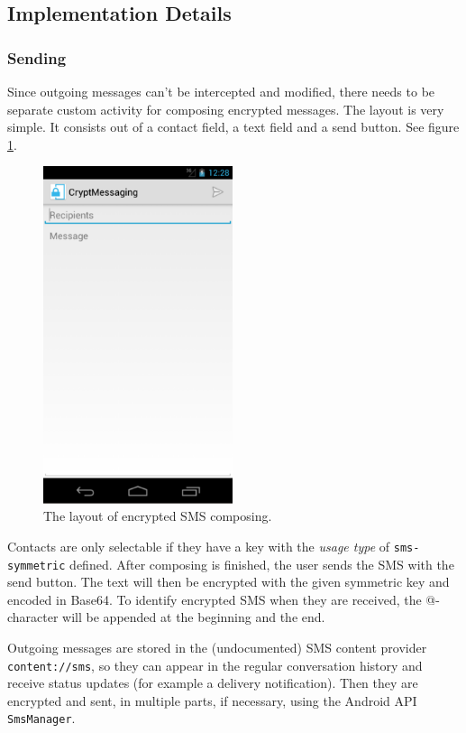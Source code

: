 \documentclass[a4paper,draft]{scrartcl}
\begin{document}
	\subsection{Implementation Details}
		\subsubsection{Sending}
			Since outgoing messages can't be intercepted and modified, there needs to be separate custom activity for composing encrypted messages.  The layout is very simple. It consists out of a contact field, a text field and a send button. See figure \ref{fig:compose}.
			\begin{figure}[h]
				\centering
					\includegraphics[width=15em]{crypt-compose}
				\caption{The layout of encrypted SMS composing.}
				\label{fig:compose}
			\end{figure}

			Contacts are only selectable if they have a key with the {\em usage type} of \texttt{sms-symmetric} defined. After composing is finished, the user sends the SMS with the send button. The text will then be encrypted with the given symmetric key and encoded in Base64. To identify encrypted SMS when they are received, the @-character will be appended at the beginning and the end.

			Outgoing messages are stored in the (undocumented) SMS content provider \linebreak %
			\texttt{content://sms}, so they can appear in the regular conversation history and receive status updates (for example a delivery notification). Then they are encrypted and sent, in multiple parts, if necessary, using the Android API \texttt{SmsManager}.
\end{document}
